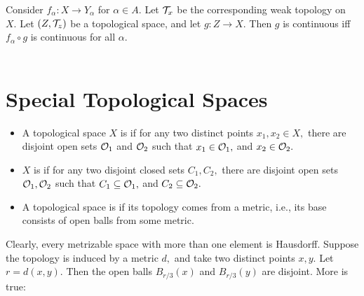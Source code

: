 \begin{prop}
Consider $f_{\alpha}:X\rightarrow Y_{\alpha}$ for $\alpha\in A.$ Let $\mathcal{T}_x$ be the corresponding weak topology on $X.$ Let $(Z,\mathcal{T}_z)$ be a topological space, and let $g:Z\rightarrow X.$ Then $g$ is continuous iff $f_{\alpha}\circ g$ is continuous for all $\alpha.$ \\ \\
\end{prop}

\section{Special Topological Spaces}
\begin{defn}
\begin{itemize}
\item A topological space $X$ is  if for any two distinct points $x_1,x_2\in X,$ there are disjoint open sets $\mathcal{O}_1$ and $\mathcal{O}_2$ such that $x_1\in\mathcal{O}_1,$ and $x_2\in\mathcal{O}_2.$
\item $X$ is  if for any two disjoint closed sets $C_1,C_2,$ there are disjoint open sets $\mathcal{O}_1,\mathcal{O}_2$ such that $C_1\subseteq\mathcal{O}_1,$ and $C_2\subseteq\mathcal{O}_2.$
\item A topological space is  if its topology comes from a metric, i.e., its base consists of open balls from some metric.
\end{itemize}
\end{defn}

\noindent Clearly, every metrizable space with more than one element is Hausdorff. Suppose the topology is induced by a metric $d,$ and take two distinct points $x,y.$ Let $r=d(x,y).$ Then the open balls $B_{r/3}(x)$ and $B_{r/3}(y)$ are disjoint. More is true:

